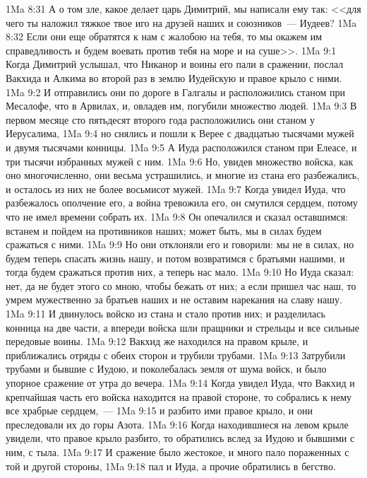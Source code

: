 \vs 1Ma 8:31 А о том зле, какое делает  царь Димитрий, мы написали ему так: <<для чего ты наложил тяжкое твое иго на друзей наших и союзников~--- Иудеев?
\vs 1Ma 8:32 Если они еще обратятся к нам с жалобою на тебя, то мы окажем им справедливость и будем воевать против тебя на море и на суше>>.
\vs 1Ma 9:1 Когда Димитрий услышал, что Никанор и воины его пали в сражении, послал Вакхида и Алкима во второй раз в землю Иудейскую и правое крыло с ними.
\vs 1Ma 9:2 И отправились они по дороге в Галгалы и расположились станом при Месалофе, что в Арвилах, и, овладев им, погубили множество людей.
\vs 1Ma 9:3 В первом месяце сто пятьдесят второго года расположились они станом у Иерусалима,
\vs 1Ma 9:4 но снялись и пошли к Верее с двадцатью тысячами мужей и двумя тысячами конницы.
\vs 1Ma 9:5 А Иуда расположился станом при Елеасе, и три тысячи избранных мужей с ним.
\vs 1Ma 9:6 Но, увидев множество войска, как оно многочисленно, они весьма устрашились, и многие из стана его разбежались, и осталось из них не более восьмисот мужей.
\vs 1Ma 9:7 Когда увидел Иуда, что разбежалось ополчение его, а война тревожила его, он смутился сердцем, потому что не имел времени собрать их.
\vs 1Ma 9:8 Он опечалился и сказал оставшимся: встанем и пойдем на противников наших; может быть, мы в силах будем сражаться с ними.
\vs 1Ma 9:9 Но они отклоняли его и говорили: мы не в силах, но будем теперь спасать жизнь нашу, и потом возвратимся с братьями нашими, и тогда будем сражаться против них, а теперь нас мало.
\vs 1Ma 9:10 Но Иуда сказал: нет, да не будет этого со мною, чтобы бежать от них; а если пришел час наш, то умрем мужественно за братьев наших и не оставим нарекания на славу нашу.
\vs 1Ma 9:11 И двинулось войско из стана и стало против них; и разделилась конница на две части, а впереди войска шли пращники и стрельцы и все сильные передовые воины.
\vs 1Ma 9:12 Вакхид же находился на правом крыле, и приближались отряды с обеих сторон и трубили трубами.
\vs 1Ma 9:13 Затрубили трубами и бывшие с Иудою, и поколебалась земля от шума войск, и было упорное сражение от утра до вечера.
\vs 1Ma 9:14 Когда увидел Иуда, что Вакхид и крепчайшая часть его войска находится на правой стороне, то собрались к нему все храбрые сердцем,~---
\vs 1Ma 9:15 и разбито ими правое крыло, и они преследовали их до горы Азота.
\vs 1Ma 9:16 Когда находившиеся на левом крыле увидели, что правое крыло разбито, то обратились вслед за Иудою и бывшими с ним, с тыла.
\vs 1Ma 9:17 И сражение было жестокое, и много пало пораженных с той и другой стороны,
\vs 1Ma 9:18 пал и Иуда, а прочие обратились в бегство.
